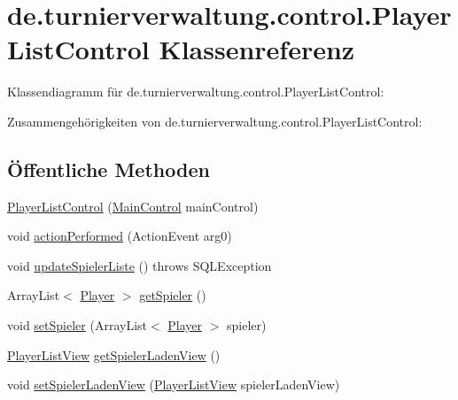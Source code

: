 \hypertarget{classde_1_1turnierverwaltung_1_1control_1_1_player_list_control}{}\section{de.\+turnierverwaltung.\+control.\+Player\+List\+Control Klassenreferenz}
\label{classde_1_1turnierverwaltung_1_1control_1_1_player_list_control}


Klassendiagramm für de.\+turnierverwaltung.\+control.\+Player\+List\+Control\+:


Zusammengehörigkeiten von de.\+turnierverwaltung.\+control.\+Player\+List\+Control\+:
\subsection*{Öffentliche Methoden}
\begin{DoxyCompactItemize}
\item 
\hyperlink{classde_1_1turnierverwaltung_1_1control_1_1_player_list_control_afd87a6113dccd6c6f0a0e4f60a730496}{Player\+List\+Control} (\hyperlink{classde_1_1turnierverwaltung_1_1control_1_1_main_control}{Main\+Control} main\+Control)
\item 
void \hyperlink{classde_1_1turnierverwaltung_1_1control_1_1_player_list_control_a04754b260ecae788e606f266c1a07337}{action\+Performed} (Action\+Event arg0)
\item 
void \hyperlink{classde_1_1turnierverwaltung_1_1control_1_1_player_list_control_a148074bb9ca98c8e308b1bebccc71f9c}{update\+Spieler\+Liste} ()  throws S\+Q\+L\+Exception 
\item 
Array\+List$<$ \hyperlink{classde_1_1turnierverwaltung_1_1model_1_1_player}{Player} $>$ \hyperlink{classde_1_1turnierverwaltung_1_1control_1_1_player_list_control_a71966b204b7684212c25e626cd37dcd2}{get\+Spieler} ()
\item 
void \hyperlink{classde_1_1turnierverwaltung_1_1control_1_1_player_list_control_a2de848c4bd757fa57d417d2b86edf9dc}{set\+Spieler} (Array\+List$<$ \hyperlink{classde_1_1turnierverwaltung_1_1model_1_1_player}{Player} $>$ spieler)
\item 
\hyperlink{classde_1_1turnierverwaltung_1_1view_1_1_player_list_view}{Player\+List\+View} \hyperlink{classde_1_1turnierverwaltung_1_1control_1_1_player_list_control_afb92f324aa02e61f4d3b612db05c682f}{get\+Spieler\+Laden\+View} ()
\item 
void \hyperlink{classde_1_1turnierverwaltung_1_1control_1_1_player_list_control_a20a6db87b5d80ba4e10d85147a4be311}{set\+Spieler\+Laden\+View} (\hyperlink{classde_1_1turnierverwaltung_1_1view_1_1_player_list_view}{Player\+List\+View} spieler\+Laden\+View)
\end{DoxyCompactItemize}


